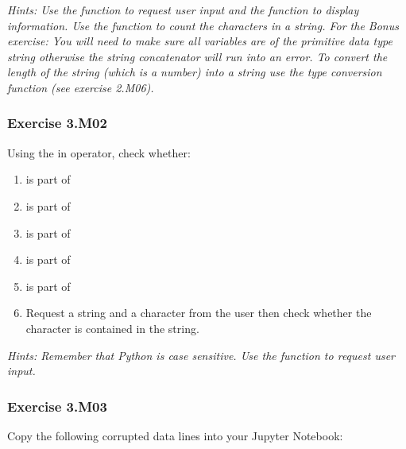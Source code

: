 \textit{Hints:
Use the {} function to request user input and the {} function to display information. Use the {} function to count the characters in a string.
For the Bonus exercise: You will need to make sure all variables are of the primitive data type
string otherwise the string concatenator will run into an error. To convert the length of the
string (which is a number) into a string use the type conversion function {} (see exercise 2.M06).}\\[1cm]



\subsubsection*{Exercise 3.M02}
Using the in operator, check whether:
\begin{enumerate}[label=(\alph*)]
	\item {} is part of {}
	\item {} is part of {}
	\item {} is part of {}
	\item {} is part of {}
	\item {} is part of {}
	\item Request a string and a character from the user then check whether the character is
contained in the string.
\end{enumerate}


\textit{Hints:
Remember that Python is case sensitive. Use the {} function to request user input.}\\[1cm]





\subsubsection*{Exercise 3.M03}
Copy the following corrupted data lines into your Jupyter Notebook:
\begin{center}
	{}
\end{center}

